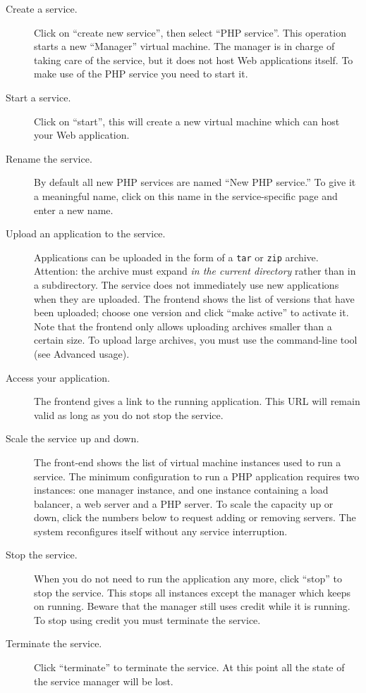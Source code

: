\documentclass[10pt]{article}
\begin{document}
\begin{description}
\item[Create a service.] Click on ``create new service'', then select
  ``PHP service''. This operation starts a new ``Manager'' virtual
  machine. The manager is in charge of taking care of the service, but
  it does not host Web applications itself. To make use of the PHP
  service you need to start it.
\item[Start a service.] Click on ``start'', this will create a new
  virtual machine which can host your Web application.
\item[Rename the service.] By default all new PHP services are named
  ``New PHP service.'' To give it a meaningful name, click on this
  name in the service-specific page and enter a new name.
\item[Upload an application to the service.] Applications can be
  uploaded in the form of a \texttt{tar} or \texttt{zip} archive.
  Attention: the archive must expand \emph{in the current directory}
  rather than in a subdirectory. The service does not immediately use
  new applications when they are uploaded. The frontend shows the list
  of versions that have been uploaded; choose one version and click
  ``make active'' to activate it. Note that the frontend only allows
  uploading archives smaller than a certain size. To upload large
  archives, you must use the command-line tool (see Advanced usage).
\item[Access your application.] The frontend gives a link to the
  running application. This URL will remain valid as long as you do
  not stop the service.
\item[Scale the service up and down.] The front-end shows the list of
  virtual machine instances used to run a service. The minimum
  configuration to run a PHP application requires two instances: one
  manager instance, and one instance containing a load balancer, a web
  server and a PHP server. To scale the capacity up or down, click the
  numbers below to request adding or removing servers. The system
  reconfigures itself without any service interruption.
\item[Stop the service.] When you do not need to run the application
  any more, click ``stop'' to stop the service. This stops all
  instances except the manager which keeps on running. Beware that the
  manager still uses credit while it is running. To stop using credit
  you must terminate the service.
\item[Terminate the service.] Click ``terminate'' to terminate the
  service. At this point all the state of the service manager will be
  lost.
\end{description}
\end{document}

